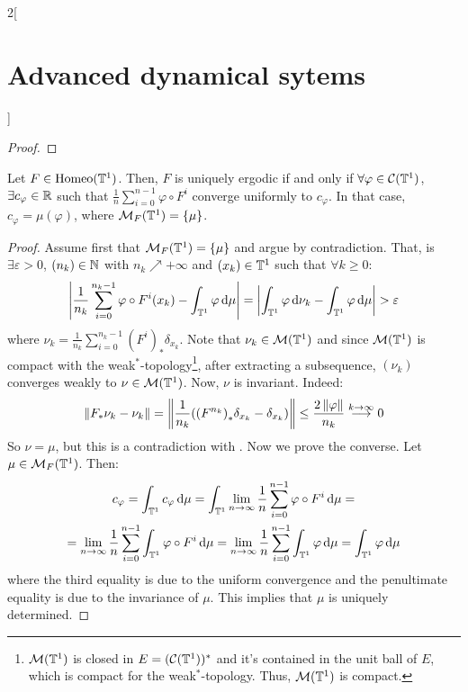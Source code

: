 \documentclass[../../../main_math.tex]{subfiles}
\begin{document}
\begin{multicols}{2}[\section{Advanced dynamical sytems}]
\begin{proof}
  \end{proof}
  \begin{proposition}\label{ADS:birkov_sum_converge}
    Let $F\in \mathrm{Homeo}(\mathbb{T}^1)$. Then, $F$ is uniquely ergodic if and only if $\forall \varphi\in\mathcal{C}(\mathbb{T}^1)$, $\exists c_\varphi\in\mathbb{R}$ such that $\frac{1}{n}\sum_{i=0}^{n-1}\varphi\circ F^i$ converge uniformly to $c_\varphi$. In that case, $c_\varphi=\mu(\varphi)$, where $\mathcal{M}_F(\mathbb{T}^1)=\{\mu\}$.
  \end{proposition}
  \begin{proof}
    Assume first that $\mathcal{M}_F(\mathbb{T}^1)=\{\mu\}$ and argue by contradiction. That, is $\exists \varepsilon>0$, $(n_k)\in\mathbb{N}$ with $n_k\nearrow +\infty$ and $(x_k)\in\mathbb{T}^1$ such that $\forall k\geq 0$:
    \begin{equation}\label{ADS:nuk_mu}
      \abs{\frac{1}{n_k}\sum_{i=0}^{n_k-1}\varphi\circ F^i(x_k)-\int_{\mathbb{T}^1}\varphi\dd{\mu}}=\abs{\int_{\mathbb{T}^1}\varphi\dd{\nu_k}-\int_{\mathbb{T}^1}\varphi\dd{\mu}}>\varepsilon
    \end{equation}
    $$
    $$
    where $\nu_k=\frac{1}{n_k}\sum_{i=0}^{n_k-1}{(F^i)}_*\delta_{x_k}$. Note that $\nu_k\in\mathcal{M}(\mathbb{T}^1)$ and since $\mathcal{M}(\mathbb{T}^1)$ is compact with the weak$^*$-topology\footnote{$\mathcal{M}(\mathbb{T}^1)$ is closed in $E=(\mathcal{C}(\mathbb{T}^1))^*$ and it's contained in the unit ball of $E$, which is compact for the weak$^*$-topology. Thus, $\mathcal{M}(\mathbb{T}^1)$ is compact.}, after extracting a subsequence, $(\nu_k)$ converges weakly to $\nu\in\mathcal{M}(\mathbb{T}^1)$. Now, $\nu$ is invariant. Indeed:
    $$
      \left\|F_*\nu_k-\nu_k\right\|=\left\|\frac{1}{n_k}({(F^{n_k})}_*\delta_{x_k}-\delta_{x_k})\right\|\leq \frac{
        2\left\|\varphi\right\|}{n_k}\overset{k\to\infty}{\longrightarrow} 0
    $$
    So $\nu =\mu$, but this is a contradiction with . Now we prove the converse. Let $\mu\in\mathcal{M}_F(\mathbb{T}^1)$. Then:
    \begin{multline*}
      c_\varphi =\int_{\mathbb{T}^1}c_\varphi\dd{\mu} =\int_{\mathbb{T}^1}\lim_{n\to\infty}\frac{1}{n}\sum_{i=0}^{n-1}\varphi\circ F^i\dd{\mu} =\\
      =\lim_{n\to\infty}\frac{1}{n}\sum_{i=0}^{n-1}\int_{\mathbb{T}^1}\varphi\circ F^i\dd{\mu}=\lim_{n\to\infty}\frac{1}{n}\sum_{i=0}^{n-1}\int_{\mathbb{T}^1}\varphi\dd{\mu} =\int_{\mathbb{T}^1}\varphi\dd{\mu}
    \end{multline*}
    where the third equality is due to the uniform convergence and the penultimate equality is due to the invariance of $\mu$. This implies that $\mu$ is uniquely determined.
  \end{proof}

\end{multicols}
\end{document}
